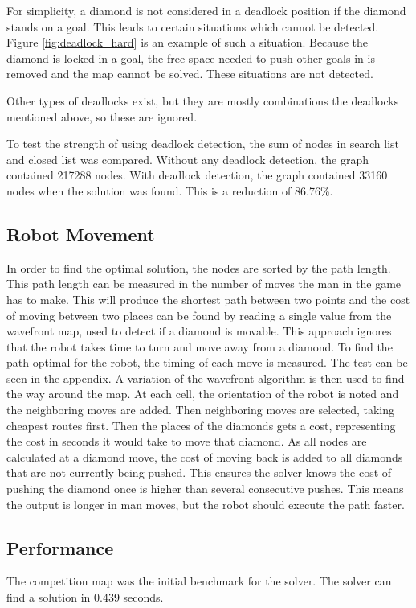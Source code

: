 For simplicity, a diamond is not considered in a deadlock position if the diamond stands on a goal.
This leads to certain situations which cannot be detected.
Figure \ref{fig:deadlock_hard} is an example of such a situation.
Because the diamond is locked in a goal, the free space needed to push other goals in is removed and the map cannot be solved.
These situations are not detected.

Other types of deadlocks exist, but they are mostly combinations the deadlocks mentioned above, so these are ignored.


To test the strength of using deadlock detection, the sum of nodes in search list and closed list was compared.
Without any deadlock detection, the graph contained 217288 nodes.
With deadlock detection, the graph contained 33160 nodes when the solution was found.
This is a reduction of 86.76\%. 

\subsection{Robot Movement}
In order to find the optimal solution, the nodes are sorted by the path length.
This path length can be measured in the number of moves the man in the game has to make.
This will produce the shortest path between two points and the cost of moving between two places can be found by reading a single value from the wavefront map, used to detect if a diamond is movable.
This approach ignores that the robot takes time to turn and move away from a diamond.
To find the path optimal for the robot, the timing of each move is measured.
The test can be seen in the appendix.
A variation of the wavefront algorithm is then used to find the way around the map.
At each cell, the orientation of the robot is noted and the neighboring moves are added.
Then neighboring moves are selected, taking cheapest routes first.
Then the places of the diamonds gets a cost, representing the cost in seconds it would take to move that diamond.
As all nodes are calculated at a diamond move, the cost of moving back is added to all diamonds that are not currently being pushed.
This ensures the solver knows the cost of pushing the diamond once is higher than several consecutive pushes. 
This means the output is longer in man moves, but the robot should execute the path faster.

\subsection{Performance}
The competition map was the initial benchmark for the solver.
The solver can find a solution in 0.439 seconds.

